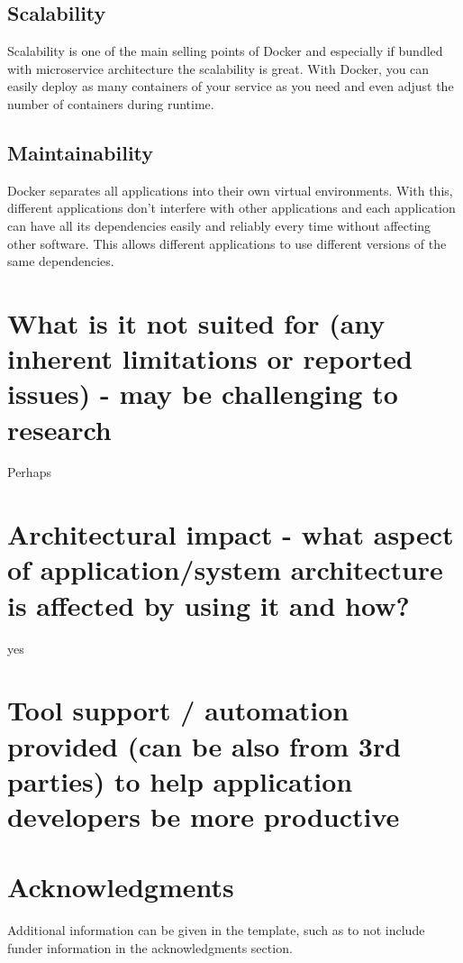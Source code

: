 \documentclass[fleqn,12pt]{olplainarticle}
\begin{document}
\subsection{Scalability}
Scalability is one of the main selling points of Docker and especially if bundled with microservice architecture the scalability is great. With Docker, you can easily deploy as many containers of your service as you need and even adjust the number of containers during runtime.
\subsection{Maintainability}
Docker separates all applications into their own virtual environments. With this, different applications don't interfere with other applications and each application can have all its dependencies easily and reliably every time without affecting other software. This allows different applications to use different versions of the same dependencies.

\section{What is it not suited for (any inherent limitations or reported issues) - may be challenging to research}

Perhaps

\section{Architectural impact - what aspect of application/system architecture is affected by using it and how?}
yes
\section{Tool support / automation provided (can be also from 3rd parties) to help application developers be more productive}

\section{Acknowledgments}

Additional information can be given in the template, such as to not include funder information in the acknowledgments section.


\end{document}
